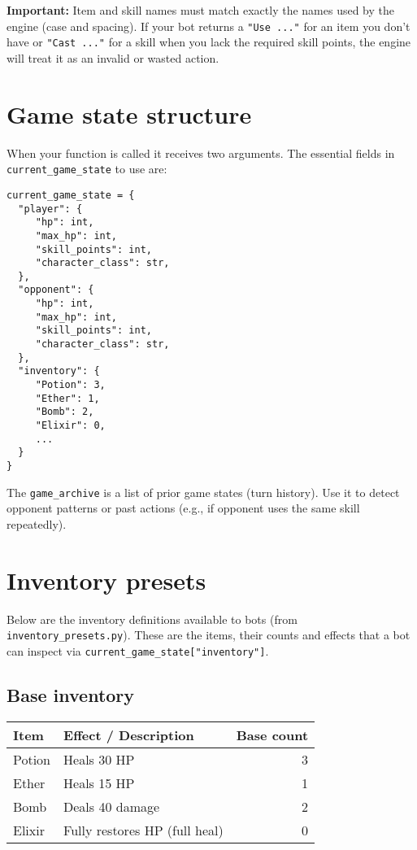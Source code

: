 \documentclass[11pt]{article}
\begin{document}
\textbf{Important:} Item and skill names must match exactly the names used by the engine (case and spacing). If your bot returns a \texttt{"Use ..."} for an item you don't have or \texttt{"Cast ..."} for a skill when you lack the required skill points, the engine will treat it as an invalid or wasted action.

\section{Game state structure}
When your function is called it receives two arguments. The essential fields in \texttt{current\_game\_state} to use are:

\begin{lstlisting}
current_game_state = {
  "player": {
     "hp": int,
     "max_hp": int,
     "skill_points": int,
     "character_class": str,
  },
  "opponent": {
     "hp": int,
     "max_hp": int,
     "skill_points": int,
     "character_class": str,
  },
  "inventory": {
     "Potion": 3,
     "Ether": 1,
     "Bomb": 2,
     "Elixir": 0,
     ...
  }
}
\end{lstlisting}

\noindent The \texttt{game\_archive} is a list of prior game states (turn history). Use it to detect opponent patterns or past actions (e.g., if opponent uses the same skill repeatedly).

\section{Inventory presets}
Below are the inventory definitions available to bots (from \texttt{inventory\_presets.py}). These are the items, their counts and effects that a bot can inspect via \texttt{current\_game\_state["inventory"]}.

\subsection{Base inventory}
\begin{longtable}{@{}lp{7cm}r@{}}
\toprule
\textbf{Item} & \textbf{Effect / Description} & \textbf{Base count} \\
\midrule
Potion & Heals 30 HP & 3 \\
Ether & Heals 15 HP & 1 \\
Bomb & Deals 40 damage & 2 \\
Elixir & Fully restores HP (full heal) & 0 \\
\bottomrule
\end{longtable}
\end{document}
